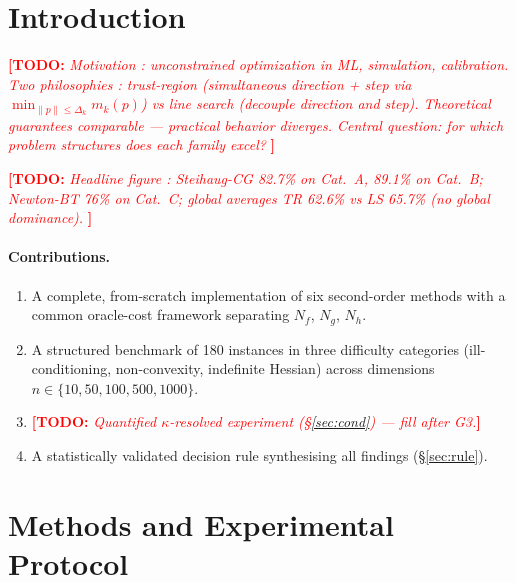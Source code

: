 \documentclass[11pt,a4paper]{article}
\newcommand{\TODO}[1]{\textcolor{red}{\textbf{[TODO:} \textit{#1}\textbf{]}}}
\newcommand{\norm}[1]{\lVert#1\rVert}
\newcommand{\mk}{m_k}
\newcommand{\dk}{\Delta_k}
\begin{document}
\section{Introduction}
\label{sec:intro}

\TODO{%
  Motivation : unconstrained optimization in ML, simulation, calibration.
  Two philosophies : trust-region (simultaneous direction + step via
  $\min_{\norm{p}\le\dk} \mk(p)$) vs line search (decouple direction and step).
  Theoretical guarantees comparable --- practical behavior diverges.
  Central question: for which problem structures does each family excel?
}

\TODO{%
  Headline figure : Steihaug-CG 82.7\% on Cat.~A, 89.1\% on Cat.~B;
  Newton-BT 76\% on Cat.~C; global averages TR 62.6\% vs LS 65.7\%
  (no global dominance).
}

\paragraph{Contributions.}
\begin{enumerate}
  \item A complete, from-scratch implementation of six second-order methods
        with a common oracle-cost framework separating $N_f$, $N_g$, $N_h$.
  \item A structured benchmark of 180 instances in three difficulty
        categories (ill-conditioning, non-convexity, indefinite Hessian)
        across dimensions $n \in \{10, 50, 100, 500, 1000\}$.
  \item \TODO{Quantified $\kappa$-resolved experiment (§\ref{sec:cond})
        --- fill after G3.}
  \item A statistically validated decision rule synthesising all findings
        (§\ref{sec:rule}).
\end{enumerate}

\section{Methods and Experimental Protocol}
\label{sec:methods}
\end{document}
